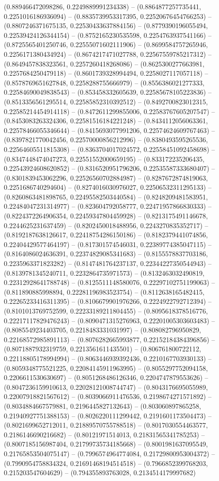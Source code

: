 (0.889466472098286, 0.2249889991234338) -- (0.8864877257735441, 0.2251016186936094) -- (0.8835739953317395, 0.22520676454766253) -- (0.8807246371675135, 0.22530433637884156) -- (0.8779390196055494, 0.22539424126344154) -- (0.8752165230535598, 0.2254763937541166) -- (0.8725565401250746, 0.22555071602111906) -- (0.8699584757265946, 0.2256171380434924) -- (0.8674217471027788, 0.22567559785217312) -- (0.8649457838323561, 0.2257260418268086) -- (0.8625300277663981, 0.2257684250479118) -- (0.8601739328994494, 0.2258027117057118) -- (0.8578769651627848, 0.2258288755666979) -- (0.8556386021277333, 0.22584690049838543) -- (0.853458332605639, 0.22585678105223836) -- (0.8513356561295514, 0.22585852310392512) -- (0.8492700823012315, 0.22585214454914118) -- (0.8472611299855006, 0.22583767605207547) -- (0.8453083263324306, 0.22581516184221248) -- (0.8434112056063361, 0.22578466055346644) -- (0.8415693077991206, 0.22574624609767463) -- (0.8397821770042456, 0.22570000856212996) -- (0.8380493595265536, 0.22564605511815308) -- (0.8363704017024572, 0.22558451092458698) -- (0.8347448474047273, 0.22551552000659195) -- (0.833172235206435, 0.22543924608620852) -- (0.8316520951796206, 0.22535587333680407) -- (0.8301839453062296, 0.22526560702884987) -- (0.8287672874819063, 0.2251686740294604) -- (0.8274016030976027, 0.22506532311295133) -- (0.8260863481898765, 0.22495582503440584) -- (0.8248209481583951, 0.22484047231314977) -- (0.823604792058777, 0.22471957866830333) -- (0.8224372264906354, 0.22459347804459928) -- (0.8213175491146678, 0.2244625231637459) -- (0.8202450018488956, 0.2243270835352717) -- (0.8192187638126617, 0.22418754286150186) -- (0.8182379441074856, 0.22404429577464197) -- (0.817301574546031, 0.22389774385047115) -- (0.8164086024636391, 0.22374829085341683) -- (0.8155578837703186, 0.2235963371823282) -- (0.8147481764237137, 0.22344227350544943) -- (0.8139781345240711, 0.2232864735971573) -- (0.8132463032490819, 0.22312928641788748) -- (0.8125511148580076, 0.22297102751199063) -- (0.811890885998894, 0.22281196983523754) -- (0.8112638165482415, 0.22265233416311395) -- (0.8106679901976266, 0.2224922792712394) -- (0.8101013769752599, 0.22233189211804455) -- (0.8095618378516776, 0.22217117829476243) -- (0.8090471315276963, 0.22201005303603483) -- (0.8085549234403705, 0.2218483331031997) -- (0.808082796950829, 0.22168572985891113) -- (0.8076282665993877, 0.22152184384396856) -- (0.8071887932319759, 0.2213561611435501) -- (0.806761800722112, 0.22118805178994994) -- (0.8063446939392436, 0.2210167703930133) -- (0.8059348775521225, 0.22084145911963995) -- (0.8055297752094158, 0.2206611530630697) -- (0.8051268486126346, 0.2204747879553626) -- (0.8047236159910613, 0.22028121008744747) -- (0.8043176695055989, 0.22007918821567612) -- (0.8039066911476536, 0.2198674271571892) -- (0.8034884667579881, 0.2196445827132643) -- (0.803060897865258, 0.21940927751388153) -- (0.8026220111299442, 0.2191601173504473) -- (0.8021699652712011, 0.21889570755788518) -- (0.8017030554463577, 0.2186146690216682) -- (0.80121971514013, 0.21831565341785253) -- (0.8007185156987404, 0.21799735734185668) -- (0.8001981637095549, 0.21765853504075147) -- (0.7996574964774084, 0.21729800953004372) -- (0.7990954758834324, 0.21691468194514518) -- (0.7966852399768203, 0.215203547604629) -- (0.794355893763028, 0.2134514179997682) 